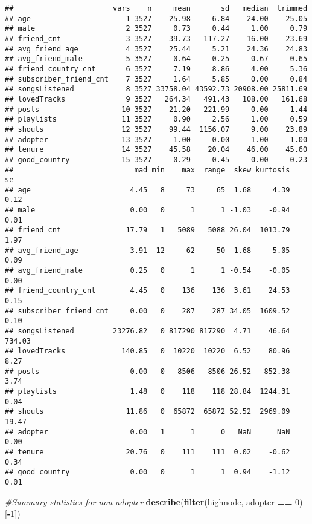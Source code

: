 \documentclass[]{article}
\newenvironment{Shaded}{\begin{snugshade}}{\end{snugshade}}
\newcommand{\KeywordTok}[1]{\textcolor[rgb]{0.13,0.29,0.53}{\textbf{#1}}}
\newcommand{\DecValTok}[1]{\textcolor[rgb]{0.00,0.00,0.81}{#1}}
\newcommand{\StringTok}[1]{\textcolor[rgb]{0.31,0.60,0.02}{#1}}
\newcommand{\CommentTok}[1]{\textcolor[rgb]{0.56,0.35,0.01}{\textit{#1}}}
\newcommand{\OperatorTok}[1]{\textcolor[rgb]{0.81,0.36,0.00}{\textbf{#1}}}
\newcommand{\NormalTok}[1]{#1}
\begin{document}
\begin{verbatim}
##                       vars    n     mean       sd   median  trimmed
## age                      1 3527    25.98     6.84    24.00    25.05
## male                     2 3527     0.73     0.44     1.00     0.79
## friend_cnt               3 3527    39.73   117.27    16.00    23.69
## avg_friend_age           4 3527    25.44     5.21    24.36    24.83
## avg_friend_male          5 3527     0.64     0.25     0.67     0.65
## friend_country_cnt       6 3527     7.19     8.86     4.00     5.36
## subscriber_friend_cnt    7 3527     1.64     5.85     0.00     0.84
## songsListened            8 3527 33758.04 43592.73 20908.00 25811.69
## lovedTracks              9 3527   264.34   491.43   108.00   161.68
## posts                   10 3527    21.20   221.99     0.00     1.44
## playlists               11 3527     0.90     2.56     1.00     0.59
## shouts                  12 3527    99.44  1156.07     9.00    23.89
## adopter                 13 3527     1.00     0.00     1.00     1.00
## tenure                  14 3527    45.58    20.04    46.00    45.60
## good_country            15 3527     0.29     0.45     0.00     0.23
##                            mad min    max  range  skew kurtosis     se
## age                       4.45   8     73     65  1.68     4.39   0.12
## male                      0.00   0      1      1 -1.03    -0.94   0.01
## friend_cnt               17.79   1   5089   5088 26.04  1013.79   1.97
## avg_friend_age            3.91  12     62     50  1.68     5.05   0.09
## avg_friend_male           0.25   0      1      1 -0.54    -0.05   0.00
## friend_country_cnt        4.45   0    136    136  3.61    24.53   0.15
## subscriber_friend_cnt     0.00   0    287    287 34.05  1609.52   0.10
## songsListened         23276.82   0 817290 817290  4.71    46.64 734.03
## lovedTracks             140.85   0  10220  10220  6.52    80.96   8.27
## posts                     0.00   0   8506   8506 26.52   852.38   3.74
## playlists                 1.48   0    118    118 28.84  1244.31   0.04
## shouts                   11.86   0  65872  65872 52.52  2969.09  19.47
## adopter                   0.00   1      1      0   NaN      NaN   0.00
## tenure                   20.76   0    111    111  0.02    -0.62   0.34
## good_country              0.00   0      1      1  0.94    -1.12   0.01
\end{verbatim}

\begin{Shaded}
\begin{Highlighting}[]
\CommentTok{#Summary statistics for non-adopter}
\KeywordTok{describe}\NormalTok{(}\KeywordTok{filter}\NormalTok{(highnode, adopter }\OperatorTok{==}\StringTok{ }\DecValTok{0}\NormalTok{)[}\OperatorTok{-}\DecValTok{1}\NormalTok{])}
\end{Highlighting}
\end{Shaded}
\end{document}
